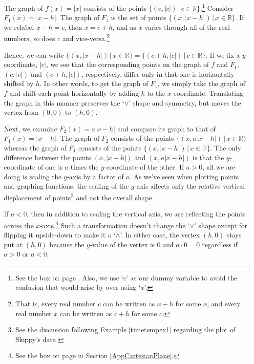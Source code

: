 \medskip

The graph of $f(x) = |x|$ consists of the points $\{ (c, |c|) \, | \, c \in \mathbb R\}$.\footnote{See the box on page \pageref{waystorepresentfunctionsbox}.  Also, we use `$c$'  as our dummy variable to avoid the confusion that would arise by over-using `$x$'.}    Consider $F_{1}(x) = |x - h|$.  The graph of $F_{1}$  is the set of points $\{ (x, |x - h|) \, | \, x \in \mathbb{R} \}$.  If we relabel $x - h = c$, then $x = c + h$, and as $x$ varies through all of the real numbers, so does $c$ and vice-versa.\footnote{That is, every real number $c$ can be written as $x - h$ for some $x$, and every real number $x$ can be written as $c + h$ for some $c$.}   

\medskip

Hence, we can write $\{ (x, |x - h|) \, | \, x \in \mathbb{R} \} = \{ (c + h, |c|) \, | \, c \in \mathbb{R} \}$.    If we fix a $y$-coordinate, $|c|$,  we see that the corresponding points on the graph of $f$ and $F_{1}$,  $(c, |c|)$ and $(c + h, |c|)$, respectively, differ only in that one is horizontally shifted by $h$.   In other words, to get the graph of $F_{1}$, we simply take the graph of $f$ and shift each point horizontally by adding $h$ to the $x$-coordinate.  Translating the graph in this manner preserves the `$\vee$' shape and symmetry, but moves the vertex from $(0, 0)$ to $(h, 0)$.

\medskip

Next, we examine $F_{2}(x) = a|x - h|$ and compare its graph to that of $F_{1}(x) = |x - h|$.  The graph of $F_{2}$ consists of the points $\{ (x, a|x - h|) \, | \, x \in \mathbb{R} \}$ whereas the graph of $F_{1}$ consists of the points $\{ (x, |x - h|) \, | \, x \in \mathbb{R} \}$.  The only difference between the points $(x, |x - h|)$ and $(x, a|x - h|)$ is that the $y$-coordinate of one is $a$ times the $y$-coordinate of the other.   If $a > 0$, all we are doing is scaling the $y$-axis by a factor of $a$.  As we've seen when plotting points and graphing functions, the scaling of the $y$-axis affects only the relative vertical displacement of points\footnote{See the discussion following Example \ref{timetempex1} regarding the plot of Skippy's data.} and not the overall shape.   

\medskip

If $a < 0$, then in addition to scaling the vertical axis, we are reflecting the points across the $x$-axis.\footnote{See the box on page \pageref{reflectionsinabox} in Section \ref{AppCartesianPlane}.} Such a transformation doesn't change the `$\vee$' shape except for flipping it upside-down to make it a `$\wedge$'.  In either case, the vertex $(h, 0)$ stays put at $(h, 0)$ because the $y$-value of the vertex is $0$ and $a \cdot 0 = 0$ regardless if $a > 0$ or $a < 0$.

